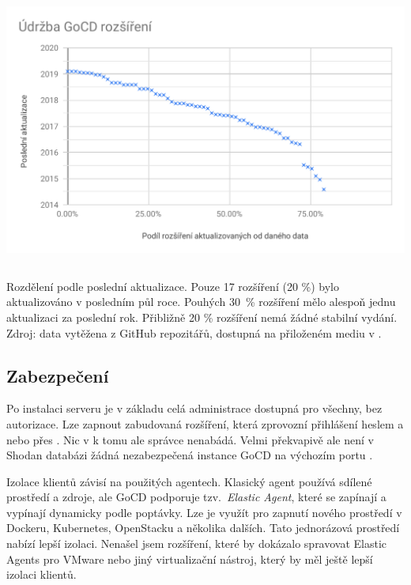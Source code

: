         \begin{iffigure}
            \centering
            \includegraphics[width=\textwidth,height=9cm,keepaspectratio]{media/go-plugins-update.pdf}
            \caption{Rozdělení podle poslední aktualizace. Pouze 17 rozšíření (20 \%) bylo aktualizováno v posledním půl roce. Pouhých 30~\% rozšíření mělo alespoň jednu aktualizaci za poslední rok. Přibližně 20 \% rozšíření nemá žádné stabilní vydání. Zdroj: data vytěžena z GitHub repozitářů, dostupná na přiloženém mediu v .}
            \label{fig:jenkins-plugins}
        \end{iffigure}

    \subsection{Zabezpečení}
        Po instalaci serveru je v základu celá administrace dostupná pro všechny, bez autorizace. Lze zapnout zabudovaná rozšíření, která zprovozní přihlášení heslem a nebo přes . Nic v  k tomu ale správce nenabádá. Velmi překvapivě ale není v Shodan databázi žádná nezabezpečená instance GoCD na výchozím portu \cite{shodan-gocd}.

        Izolace klientů závisí na použitých agentech. Klasický agent používá sdílené prostředí a zdroje, ale GoCD podporuje tzv.~\textit{Elastic Agent}, které se zapínají a vypínají dynamicky podle poptávky. Lze je využít pro zapnutí nového prostředí v Dockeru, Kubernetes, OpenStacku a několika dalších. Tato jednorázová prostředí nabízí lepší izolaci. Nenašel jsem rozšíření, které by dokázalo spravovat Elastic Agents pro VMware nebo jiný virtualizační nástroj, který by měl ještě lepší izolaci klientů.

